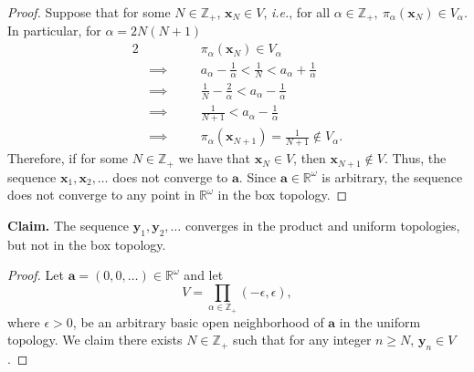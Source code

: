 \documentclass[a4paper,10pt]{article}
\newcommand{\bx}{\mathbf{x}}
\newcommand{\by}{\mathbf{y}}
\newcommand{\ZZ}{\mathbb{Z}}
\newcommand{\RR}{\mathbb{R}}
\begin{document}
\begin{solution}
\begin{proof}
        Suppose that for some $N \in \ZZ_+$, $\bx_N \in V$, \textit{i.e.}, for all $\alpha \in \ZZ_+,~ \pi_\alpha(\bx_N) \in V_\alpha$.
        In particular, for $\alpha = 2 N (N + 1)$
        \begin{alignat*}{2}
            &           && \quad \pi_\alpha(\bx_N) \in V_\alpha \\
            & \implies  && \quad a_\alpha - \tfrac{1}{\alpha} < \tfrac{1}{N} < a_\alpha + \tfrac{1}{\alpha} \\
            & \implies  && \quad \tfrac{1}{N} - \tfrac{2}{\alpha} < a_\alpha - \tfrac{1}{\alpha} \\
            & \implies  && \quad \tfrac{1}{N + 1} < a_\alpha - \tfrac{1}{\alpha} \\
            & \implies  && \quad \pi_\alpha(\bx_{N+1}) = \tfrac{1}{N+1} \not\in V_\alpha.
        \end{alignat*}
        Therefore, if for some $N \in \ZZ_+$ we have that $\bx_N \in V$, then $\bx_{N+1} \not\in V$.
        Thus, the sequence $\bx_1, \bx_2, \ldots$ does not converge to $\mathbf{a}$.
        Since $\mathbf{a} \in \RR^\omega$ is arbitrary, the sequence does not converge to any point in $\RR^\omega$ in the box topology.
    \end{proof}
    \bigskip

    \textbf{Claim.} The sequence $\by_1, \by_2, \ldots$ converges in the product and uniform topologies, but not in the box topology.
    \begin{proof}
        Let $\mathbf{a} = (0, 0, \ldots) \in \RR^\omega$ and let
        \begin{equation*}
            V = \prod_{\alpha \in \ZZ_+} (-\epsilon, \epsilon),
        \end{equation*}
        where $\epsilon > 0$, be an arbitrary basic open neighborhood of $\mathbf{a}$ in the uniform topology.
        We claim there exists $N \in \ZZ_+$ such that for any integer $n \geq N$, $\by_n \in V$.


\end{proof}
\end{solution}
\end{document}
